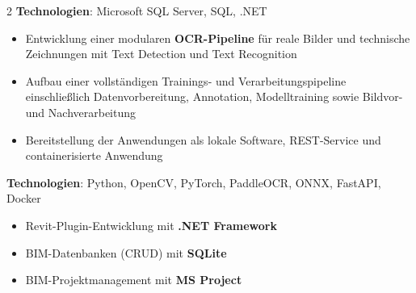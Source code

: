 \documentclass[10pt,a4paper,withhyper]{../altacv}
\begin{document}
\begin{paracol}{2}
  \textbf{Technologien}: Microsoft SQL Server, SQL, .NET

  \vspace{1.5em}


  \vspace{1.0em}

  \begin{itemize}
    \item Entwicklung einer modularen \textbf{OCR-Pipeline} für reale Bilder und technische Zeichnungen mit Text Detection und Text Recognition
    \item Aufbau einer vollständigen Trainings- und Verarbeitungspipeline einschließlich Datenvorbereitung, Annotation, Modelltraining sowie Bildvor- und Nachverarbeitung
    \item Bereitstellung der Anwendungen als lokale Software, REST-Service und containerisierte Anwendung
  \end{itemize}

  \vspace{1.0em}

  \textbf{Technologien}: Python, OpenCV, PyTorch, PaddleOCR, ONNX, FastAPI, Docker

  \vspace{1.5em}




  \vspace{1.0em}


  \vspace{1.0em}

  \begin{itemize}
    \item Revit-Plugin-Entwicklung mit \textbf{.NET Framework}
    \item BIM-Datenbanken (CRUD) mit \textbf{SQLite}
    \item BIM-Projektmanagement mit \textbf{MS Project}
  \end{itemize}

  \vspace{1.0em}


  \vspace{1.0em}


\end{paracol}
\end{document}
